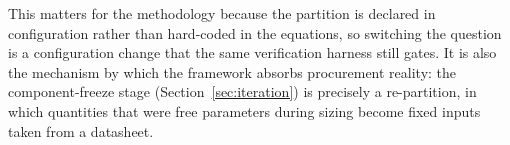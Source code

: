 This matters for the methodology because the partition is declared in
configuration rather than hard-coded in the equations, so switching the
question is a configuration change that the same verification harness
still gates. It is also the mechanism by which the framework absorbs
procurement reality: the component-freeze stage
(Section~\ref{sec:iteration}) is precisely a re-partition, in which
quantities that were free parameters during sizing become fixed inputs
taken from a datasheet.

